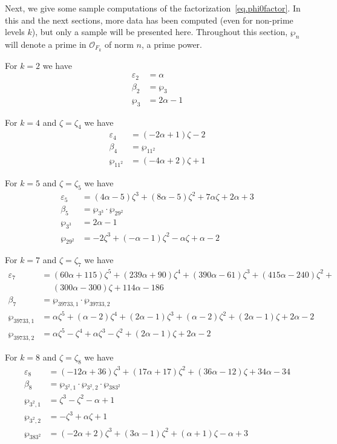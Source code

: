 \documentclass[12pt]{amsart}
\theoremstyle{definition}
\def\calO{\mathcal O}
\def\a{\alpha}
\def\z{\zeta}
\def\z{\zeta}
\begin{document}
Next, we give some sample computations of the 
factorization~\eqref{eq.phi0factor}. In this and the next sections,
more data has been computed (even for
non-prime levels $k$), but only a sample will be presented here. 
Throughout this section, $\wp_{n}$ will denote a prime
in $\calO_{F_k}$ of norm $n$, a prime power. 

\noindent 
For $k=2$ %
we have
{\small
\begin{align*}
\varepsilon_2 &=\a \\
\beta_2 &= \wp_{3}  \\
\wp_{3} &= 2 \a - 1
\end{align*}
}

\noindent 
For $k=4$ and $\zeta=\zeta_4$ 
we have
{\small
\begin{align*}
\varepsilon_4 &= (-2 \a + 1) \z - 2 \\
\beta_4 &= \wp_{11^2}  \\
\wp_{11^2} &= (-4 \a + 2) \z + 1
\end{align*}
}

\noindent 
For $k=5$ and $\zeta=\zeta_5$ we have
{\small
\begin{align*}
\varepsilon_5 &=
(4 \a - 5) \zeta^3 + (8 \a - 5) \zeta^2 + 7 \a \zeta + 2 \a + 3 \\
\beta_5 &= \wp_{3^3} \cdot \wp_{29^2} \\
\wp_{3^3} &=2 \a - 1 \\
\wp_{29^2} &=-2 \zeta^3 + (-\a - 1) \zeta^2 - \a \zeta + \a - 2
\end{align*}
}

\noindent 
For $k=7$ and $\zeta=\zeta_7$ we have
{\small
\begin{align*}
\varepsilon_7 &=(60 \a + 115) \zeta^5 + (239 \a + 90) \zeta^4 
+ (390 \a - 61) \zeta^3 + (415 \a - 240) \zeta^2 +
\\ & \quad\,\,
 (300 \a - 300) \zeta + 114 \a - 186 \\
\beta_7 &= \wp_{39733,1} \cdot \wp_{39733,2} \\
\wp_{39733,1} &= \a \zeta^5 + (\a - 2) \zeta^4 + (2 \a - 1) \zeta^3  
+ (\a - 2) \zeta^2 + (2 \a - 1) \zeta + 2 \a - 2 \\
\wp_{39733,2} &=\a \zeta^5 - \zeta^4 + \a \zeta^3 - \zeta^2 
+ (2 \a - 1) \zeta + 2 \a - 2
\end{align*}
}

\noindent 
For $k=8$ and $\zeta=\zeta_8$ we have
{\small
\begin{align*}
\varepsilon_8 &=
(-12 \a + 36) \z^3 + (17 \a + 17) \z^2 + (36 \a - 12) \z + 34 \a - 34 \\
\beta_8 &= \wp_{3^2,1} \cdot \wp_{3^2,2} \cdot \wp_{383^2} \\
\wp_{3^2,1} &=\z^3 - \z^2 - \a + 1 \\
\wp_{3^2,2} &= -\z^3 + \a \z + 1 \\
\wp_{383^2} &= (-2 \a + 2) \z^3 + (3 \a - 1) \z^2 + (\a + 1) \z - \a + 3
\end{align*}
}
\end{document}
